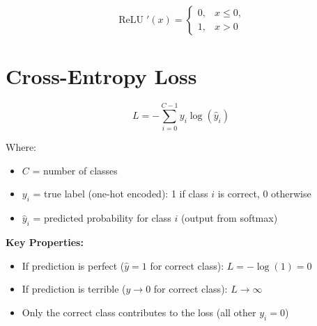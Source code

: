 \documentclass[12pt]{article}
\DeclareMathOperator{\relu}{ReLU}
\newcommand{\SectionTitle}[1]{\section*{\centering #1}\bigskip}
\begin{document}
\bigskip

\[
\relu'(x) = \begin{cases}
0, & x \leq 0, \\
1, & x > 0
\end{cases}
\]

\bigskip

\begin{center}
\end{center}

\clearpage

\SectionTitle{Cross-Entropy Loss}

\[
L = -\sum_{i=0}^{C-1} y_i \log(\hat{y}_i)
\]

\bigskip

Where:
\begin{itemize}
  \item $C$ = number of classes
  \item $y_i$ = true label (one-hot encoded): 1 if class $i$ is correct, 0 otherwise
  \item $\hat{y}_i$ = predicted probability for class $i$ (output from softmax)
\end{itemize}

\bigskip

\textbf{Key Properties:}
\begin{itemize}
  \item If prediction is perfect ($\hat{y} = 1$ for correct class): $L = -\log(1) = 0$
  \item If prediction is terrible ($\hat{y} \to 0$ for correct class): $L \to \infty$
  \item Only the correct class contributes to the loss (all other $y_i = 0$)
\end{itemize}

\bigskip

\begin{center}
\end{center}
\end{document}
